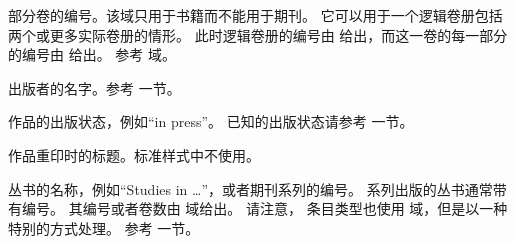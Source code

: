 \begin{fieldlist}

部分卷的编号。该域只用于书籍而不能用于期刊。
它可以用于一个逻辑卷册包括两个或更多实际卷册的情形。
此时逻辑卷册的编号由  给出，而这一卷的每一部分的编号由  给出。
参考  域。




出版者的名字。参考  一节。




作品的出版状态，例如“in press”。
已知的出版状态请参考   一节。




作品重印时的标题。标准样式中不使用。




丛书的名称，例如“Studies in \dots”，或者期刊系列的编号。
系列出版的丛书通常带有编号。
其编号或者卷数由  域给出。
请注意， 条目类型也使用  域，但是以一种特别的方式处理。
参考  一节。




\end{fieldlist}
